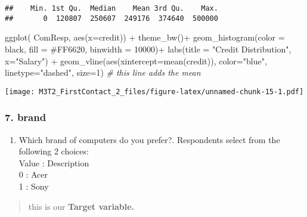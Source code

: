 \documentclass[
]{article}
\newenvironment{Shaded}{\begin{snugshade}}{\end{snugshade}}
\newcommand{\AttributeTok}[1]{\textcolor[rgb]{0.77,0.63,0.00}{#1}}
\newcommand{\CommentTok}[1]{\textcolor[rgb]{0.56,0.35,0.01}{\textit{#1}}}
\newcommand{\DecValTok}[1]{\textcolor[rgb]{0.00,0.00,0.81}{#1}}
\newcommand{\FunctionTok}[1]{\textcolor[rgb]{0.00,0.00,0.00}{#1}}
\newcommand{\NormalTok}[1]{#1}
\newcommand{\SpecialCharTok}[1]{\textcolor[rgb]{0.00,0.00,0.00}{#1}}
\newcommand{\StringTok}[1]{\textcolor[rgb]{0.31,0.60,0.02}{#1}}
\providecommand{\tightlist}{%
  \setlength{\itemsep}{0pt}\setlength{\parskip}{0pt}}
\begin{document}
\begin{verbatim}
##    Min. 1st Qu.  Median    Mean 3rd Qu.    Max. 
##       0  120807  250607  249176  374640  500000
\end{verbatim}

\begin{Shaded}
\begin{Highlighting}[]
\FunctionTok{ggplot}\NormalTok{( ComResp, }\FunctionTok{aes}\NormalTok{(}\AttributeTok{x=}\NormalTok{credit)) }\SpecialCharTok{+} \FunctionTok{theme\_bw}\NormalTok{()}\SpecialCharTok{+}
  \FunctionTok{geom\_histogram}\NormalTok{(}\AttributeTok{color =} \StringTok{\textquotesingle{}black\textquotesingle{}}\NormalTok{, }\AttributeTok{fill =} \StringTok{\textquotesingle{}\#FF6620\textquotesingle{}}\NormalTok{, }\AttributeTok{binwidth =} \DecValTok{10000}\NormalTok{)}\SpecialCharTok{+}
  \FunctionTok{labs}\NormalTok{(}\AttributeTok{title =} \StringTok{"Credit Distribution"}\NormalTok{, }\AttributeTok{x=}\StringTok{"Salary"}\NormalTok{) }\SpecialCharTok{+} 
  \FunctionTok{geom\_vline}\NormalTok{(}\FunctionTok{aes}\NormalTok{(}\AttributeTok{xintercept=}\FunctionTok{mean}\NormalTok{(credit)), }\AttributeTok{color=}\StringTok{"blue"}\NormalTok{, }\AttributeTok{linetype=}\StringTok{"dashed"}\NormalTok{, }\AttributeTok{size=}\DecValTok{1}\NormalTok{)  }\CommentTok{\# this line adds the mean}
\end{Highlighting}
\end{Shaded}

\texttt{[image: M3T2\_FirstContact\_2\_files/figure-latex/unnamed-chunk-15-1.pdf]}

\hypertarget{brand}{%
\subsubsection{7. brand}\label{brand}}

\begin{enumerate}
\def\labelenumi{\arabic{enumi})}
\setcounter{enumi}{6}
\tightlist
\item
  Which brand of computers do you prefer?. Respondents select from the
  following 2 choices:\\
  Value : Description\\
  0 : Acer\\
  1 : Sony
\end{enumerate}

\begin{quote}
this is our \textbf{Target variable.}
\end{quote}
\end{document}
